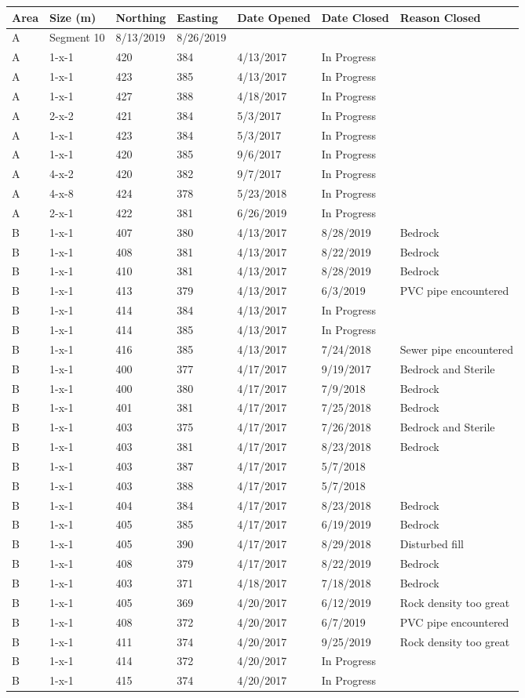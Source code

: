 \documentclass[
  12pt,
]{krantz}
\begin{document}
\begin{longtable}[]{@{}lllllll@{}}
\toprule
Area & Size (m) & Northing & Easting & Date Opened & Date Closed & Reason Closed\tabularnewline
\midrule
\endhead
A & Segment 10 & 8/13/2019 & 8/26/2019 & & &\tabularnewline
A & 1-x-1 & 420 & 384 & 4/13/2017 & In Progress &\tabularnewline
A & 1-x-1 & 423 & 385 & 4/13/2017 & In Progress &\tabularnewline
A & 1-x-1 & 427 & 388 & 4/18/2017 & In Progress &\tabularnewline
A & 2-x-2 & 421 & 384 & 5/3/2017 & In Progress &\tabularnewline
A & 1-x-1 & 423 & 384 & 5/3/2017 & In Progress &\tabularnewline
A & 1-x-1 & 420 & 385 & 9/6/2017 & In Progress &\tabularnewline
A & 4-x-2 & 420 & 382 & 9/7/2017 & In Progress &\tabularnewline
A & 4-x-8 & 424 & 378 & 5/23/2018 & In Progress &\tabularnewline
A & 2-x-1 & 422 & 381 & 6/26/2019 & In Progress &\tabularnewline
B & 1-x-1 & 407 & 380 & 4/13/2017 & 8/28/2019 & Bedrock\tabularnewline
B & 1-x-1 & 408 & 381 & 4/13/2017 & 8/22/2019 & Bedrock\tabularnewline
B & 1-x-1 & 410 & 381 & 4/13/2017 & 8/28/2019 & Bedrock\tabularnewline
B & 1-x-1 & 413 & 379 & 4/13/2017 & 6/3/2019 & PVC pipe encountered\tabularnewline
B & 1-x-1 & 414 & 384 & 4/13/2017 & In Progress &\tabularnewline
B & 1-x-1 & 414 & 385 & 4/13/2017 & In Progress &\tabularnewline
B & 1-x-1 & 416 & 385 & 4/13/2017 & 7/24/2018 & Sewer pipe encountered\tabularnewline
B & 1-x-1 & 400 & 377 & 4/17/2017 & 9/19/2017 & Bedrock and Sterile\tabularnewline
B & 1-x-1 & 400 & 380 & 4/17/2017 & 7/9/2018 & Bedrock\tabularnewline
B & 1-x-1 & 401 & 381 & 4/17/2017 & 7/25/2018 & Bedrock\tabularnewline
B & 1-x-1 & 403 & 375 & 4/17/2017 & 7/26/2018 & Bedrock and Sterile\tabularnewline
B & 1-x-1 & 403 & 381 & 4/17/2017 & 8/23/2018 & Bedrock\tabularnewline
B & 1-x-1 & 403 & 387 & 4/17/2017 & 5/7/2018 &\tabularnewline
B & 1-x-1 & 403 & 388 & 4/17/2017 & 5/7/2018 &\tabularnewline
B & 1-x-1 & 404 & 384 & 4/17/2017 & 8/23/2018 & Bedrock\tabularnewline
B & 1-x-1 & 405 & 385 & 4/17/2017 & 6/19/2019 & Bedrock\tabularnewline
B & 1-x-1 & 405 & 390 & 4/17/2017 & 8/29/2018 & Disturbed fill\tabularnewline
B & 1-x-1 & 408 & 379 & 4/17/2017 & 8/22/2019 & Bedrock\tabularnewline
B & 1-x-1 & 403 & 371 & 4/18/2017 & 7/18/2018 & Bedrock\tabularnewline
B & 1-x-1 & 405 & 369 & 4/20/2017 & 6/12/2019 & Rock density too great\tabularnewline
B & 1-x-1 & 408 & 372 & 4/20/2017 & 6/7/2019 & PVC pipe encountered\tabularnewline
B & 1-x-1 & 411 & 374 & 4/20/2017 & 9/25/2019 & Rock density too great\tabularnewline
B & 1-x-1 & 414 & 372 & 4/20/2017 & In Progress &\tabularnewline
B & 1-x-1 & 415 & 374 & 4/20/2017 & In Progress &\tabularnewline

\end{longtable}
\end{document}

